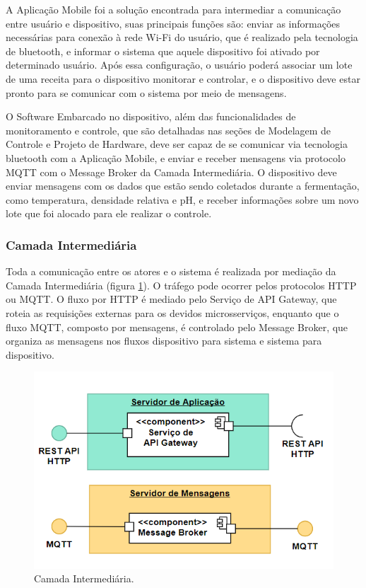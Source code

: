 A Aplicação Mobile foi a solução encontrada para intermediar a comunicação entre usuário e dispositivo, suas principais funções são: enviar as informações necessárias para conexão à rede Wi-Fi do usuário, que é realizado pela tecnologia de bluetooth, e informar o sistema que aquele dispositivo foi ativado por determinado usuário. Após essa configuração, o usuário poderá associar um lote de uma receita para o dispositivo monitorar e controlar, e o dispositivo deve estar pronto para se comunicar com o sistema por meio de mensagens.

O Software Embarcado no dispositivo, além das funcionalidades de monitoramento e controle, que são detalhadas nas seções de Modelagem de Controle e Projeto de Hardware, deve ser capaz de se comunicar via tecnologia bluetooth com a Aplicação Mobile, e enviar e receber mensagens via protocolo MQTT com o Message Broker da Camada Intermediária. O dispositivo deve enviar mensagens com os dados que estão sendo coletados durante a fermentação, como temperatura, densidade relativa e pH, e receber informações sobre um novo lote que foi alocado para ele realizar o controle.

\subsubsection{Camada Intermediária}

Toda a comunicação entre os atores e o sistema é realizada por mediação da Camada Intermediária (figura \ref{fig:camada_intermediaria}). O tráfego pode ocorrer pelos protocolos HTTP ou MQTT. O fluxo por HTTP é mediado pelo Serviço de API Gateway, que roteia as requisições externas para os devidos microsserviços, enquanto que o fluxo MQTT, composto por mensagens, é controlado pelo Message Broker, que organiza as mensagens nos fluxos dispositivo para sistema e sistema para dispositivo.

\begin{figure}[H]
    \centering
    \includegraphics[scale=0.50]{figuras/projeto/software/camada_intermediaria.PNG}
    \caption{Camada Intermediária.}
    \label{fig:camada_intermediaria}
\end{figure}


